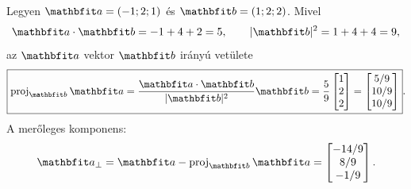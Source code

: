 \documentclass{szb-solution}
\begin{document}
Legyen $\rvec a=(-1;2;1)$ és $\rvec b=(1;2;2)$. Mivel
$$
  \rvec a\cdot\rvec b=-1+4+2=5,
  \qquad
  |\rvec b|^2=1+4+4=9,
$$
az $\rvec a$ vektor $\rvec b$ irányú vetülete
$$
  \boxed{
    \operatorname{proj}_{\rvec b}\rvec a
    =\frac{\rvec a\cdot\rvec b}{|\rvec b|^2}\rvec b
    =\frac59\begin{bmatrix}1\\2\\2\end{bmatrix}
    =\begin{bmatrix}5/9\\10/9\\10/9\end{bmatrix}
  }
  \text.
$$
A merőleges komponens:
$$
  \rvec a_\perp
  =\rvec a-\operatorname{proj}_{\rvec b}\rvec a
  =\begin{bmatrix}-14/9\\8/9\\-1/9\end{bmatrix}
  \text.
$$
\end{document}

